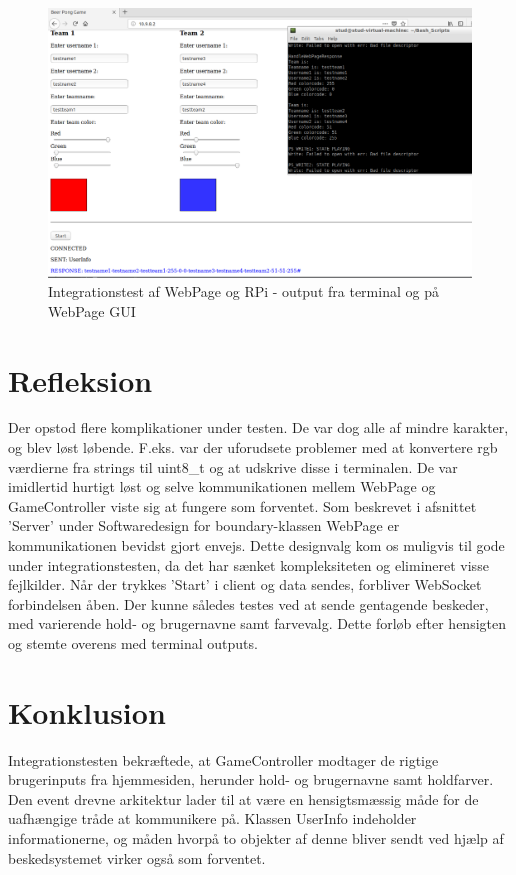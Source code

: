 \documentclass[Integrationstest/Integrationstest_main.tex]{subfiles}
\begin{document}
\begin{figure}[H]
    \centering
    \includegraphics[width=1\textwidth]{Integrationstest/WebPageogRPi/graphics/webserver.png}
    \caption{Integrationstest af WebPage og RPi - output fra terminal og på WebPage GUI}
    \label{fig:Integration_3}
\end{figure}

\section{Refleksion}
Der opstod flere komplikationer under testen. De var dog alle af mindre karakter, og blev løst løbende. F.eks. var der uforudsete problemer med at konvertere rgb værdierne fra strings til uint8\_t og at udskrive disse i terminalen. De var imidlertid hurtigt løst og selve kommunikationen mellem WebPage og GameController viste sig at fungere som forventet. Som beskrevet i afsnittet 'Server' under Softwaredesign for boundary-klassen WebPage er kommunikationen bevidst gjort envejs. Dette designvalg kom os muligvis til gode under integrationstesten, da det har sænket kompleksiteten og elimineret visse fejlkilder. Når der trykkes 'Start' i client og data sendes, forbliver WebSocket forbindelsen åben. Der kunne således testes ved at sende gentagende beskeder, med varierende hold- og brugernavne samt farvevalg. Dette forløb efter hensigten og stemte overens med terminal outputs. 

\section{Konklusion}
Integrationstesten bekræftede, at GameController modtager de rigtige brugerinputs fra hjemmesiden, herunder hold- og brugernavne samt holdfarver. Den event drevne arkitektur lader til at være en hensigtsmæssig måde for de uafhængige tråde at kommunikere på. Klassen UserInfo indeholder informationerne, og måden hvorpå to objekter af denne bliver sendt ved hjælp af beskedsystemet virker også som forventet.
\end{document}
